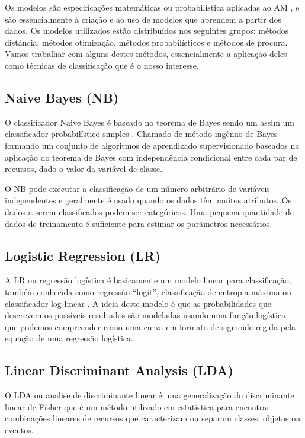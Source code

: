 Os modelos são especificações matemáticas ou probabilística aplicadas ao AM \cite{datascience}, e são essencialmente à criação e ao uso de modelos que aprendem a partir dos dados. Os modelos utilizados estão distribuídos nos seguintes grupos: métodos distância, métodos otimização, métodos probabilísticos e métodos de procura. Vamos trabalhar com alguns destes métodos, essencialmente a aplicação deles como técnicas de classificação que é o nosso interesse. 

\subsection{Naive Bayes (NB)} 

O classificador Naive Bayes é baseado no teorema de Bayes sendo um assim um classificador probabilístico simples \cite{datascience}. Chamado de método ingênuo de Bayes formando um conjunto de algoritmos de aprendizado supervisionado baseados na aplicação do teorema de Bayes com independência condicional entre cada par de recursos, dado o valor da variável de classe. 

O NB pode executar a classificação de um número arbitrário de variáveis independentes e geralmente é usado quando os dados têm muitos atributos. Os dados a serem classificados podem ser categóricos. Uma pequena quantidade de dados de treinamento é suficiente para estimar os parâmetros necessários.  

\subsection{Logistic Regression (LR)} 

A LR ou regressão logística é basicamente um modelo linear para classificação, também conhecida como regressão “logit”, classificação de entropia máxima ou classificador log-linear \cite{datascience}. A ideia deste modelo é que as probabilidades que descrevem os possíveis resultados são modeladas usando uma função logística, que podemos compreender como uma curva em formato de sigmoide regida pela equação de uma regressão logística.  

\subsection{Linear Discriminant Analysis (LDA)} 

O LDA ou analise de discriminante linear é uma generalização do discriminante linear de Fisher que é um método utilizado em estatística para encontrar combinações lineares de recursos que caracterizam ou separam classes, objetos ou eventos.  

